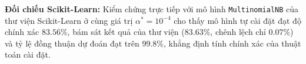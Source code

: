 \documentclass[11pt,a4paper]{article}
\begin{document}
\noindent
\textbf{Đối chiếu Scikit-Learn:} Kiểm chứng trực tiếp với mô hình \texttt{MultinomialNB} của thư viện Scikit-Learn ở cùng giá trị $\alpha^* = 10^{-4}$ cho thấy mô hình tự cài đặt đạt độ chính xác $83.56\%$, bám sát kết quả của thư viện ($83.63\%$, chênh lệch chỉ $0.07\%$) và tỷ lệ đồng thuận dự đoán đạt trên $99.8\%$, khẳng định tính chính xác của thuật toán cài đặt.

\begin{table}[H]
\centering
\small
\caption{Kết quả thực nghiệm của Multinomial Naïve Bayes ($\alpha^* = 10^{-4}$).}
\label{tab:bayes_results}
\end{table}
\end{document}
